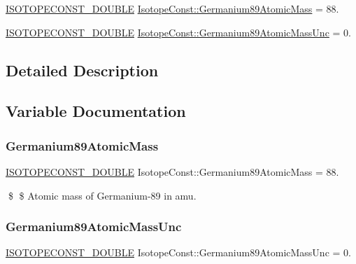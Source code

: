 \begin{DoxyCompactItemize}
\item 
\mbox{\hyperlink{group___isotope_const-_macros_ga8f45a7272ce02c0b4c65c44636ed719a}{I\+S\+O\+T\+O\+P\+E\+C\+O\+N\+S\+T\+\_\+\+D\+O\+U\+B\+LE}} \mbox{\hyperlink{group___isotope_const-_germanium-_ge89_ga59eaa4f88d5355c3b964b99db27e52fb}{Isotope\+Const\+::\+Germanium89\+Atomic\+Mass}} = 88.
\item 
\mbox{\hyperlink{group___isotope_const-_macros_ga8f45a7272ce02c0b4c65c44636ed719a}{I\+S\+O\+T\+O\+P\+E\+C\+O\+N\+S\+T\+\_\+\+D\+O\+U\+B\+LE}} \mbox{\hyperlink{group___isotope_const-_germanium-_ge89_gad15ec79598d1b455247e30b62e8676eb}{Isotope\+Const\+::\+Germanium89\+Atomic\+Mass\+Unc}} = 0.
\end{DoxyCompactItemize}


\subsection{Detailed Description}


\subsection{Variable Documentation}
\mbox{\label{group___isotope_const-_germanium-_ge89_ga59eaa4f88d5355c3b964b99db27e52fb}} 
\subsubsection{\texorpdfstring{Germanium89\+Atomic\+Mass}{Germanium89AtomicMass}}
{\footnotesize\ttfamily \mbox{\hyperlink{group___isotope_const-_macros_ga8f45a7272ce02c0b4c65c44636ed719a}{I\+S\+O\+T\+O\+P\+E\+C\+O\+N\+S\+T\+\_\+\+D\+O\+U\+B\+LE}} Isotope\+Const\+::\+Germanium89\+Atomic\+Mass = 88.}

\$ \$ Atomic mass of Germanium-\/89 in amu. \mbox{\label{group___isotope_const-_germanium-_ge89_gad15ec79598d1b455247e30b62e8676eb}} 
\subsubsection{\texorpdfstring{Germanium89\+Atomic\+Mass\+Unc}{Germanium89AtomicMassUnc}}
{\footnotesize\ttfamily \mbox{\hyperlink{group___isotope_const-_macros_ga8f45a7272ce02c0b4c65c44636ed719a}{I\+S\+O\+T\+O\+P\+E\+C\+O\+N\+S\+T\+\_\+\+D\+O\+U\+B\+LE}} Isotope\+Const\+::\+Germanium89\+Atomic\+Mass\+Unc = 0.}

